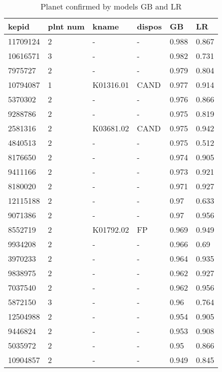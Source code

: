 \begin{table}[!htbp]
 \centering
 \caption{Planet confirmed by models GB and LR}
 \label{dataGBLRcreftab} 
  \begin{tabular}
{| 
 p{}| 
 p{}| 
 p{}| 
 p{}| 
 p{}| 
 p{}| 
}\hline 
\textbf{kepid} &\textbf{plnt num} &\textbf{kname} &\textbf{dispos} &\textbf{GB} &\textbf{LR} \\ \hline 
11709124 &2 &- &- &0.988 &0.867 \\ \hline 
10616571 &3 &- &- &0.982 &0.731 \\ \hline 
7975727 &2 &- &- &0.979 &0.804 \\ \hline 
10794087 &1 &K01316.01 &CAND &0.977 &0.914 \\ \hline 
5370302 &2 &- &- &0.976 &0.866 \\ \hline 
9288786 &2 &- &- &0.975 &0.819 \\ \hline 
2581316 &2 &K03681.02 &CAND &0.975 &0.942 \\ \hline 
4840513 &2 &- &- &0.975 &0.512 \\ \hline 
8176650 &2 &- &- &0.974 &0.905 \\ \hline 
9411166 &2 &- &- &0.973 &0.921 \\ \hline 
8180020 &2 &- &- &0.971 &0.927 \\ \hline 
12115188 &2 &- &- &0.97 &0.633 \\ \hline 
9071386 &2 &- &- &0.97 &0.956 \\ \hline 
8552719 &2 &K01792.02 &FP &0.969 &0.949 \\ \hline 
9934208 &2 &- &- &0.966 &0.69 \\ \hline 
3970233 &2 &- &- &0.964 &0.935 \\ \hline 
9838975 &2 &- &- &0.962 &0.927 \\ \hline 
7037540 &2 &- &- &0.962 &0.956 \\ \hline 
5872150 &3 &- &- &0.96 &0.764 \\ \hline 
12504988 &2 &- &- &0.954 &0.905 \\ \hline 
9446824 &2 &- &- &0.953 &0.908 \\ \hline 
5035972 &2 &- &- &0.95 &0.866 \\ \hline 
10904857 &2 &- &- &0.949 &0.845 \\ \hline 

\end{tabular}
\end{table}
